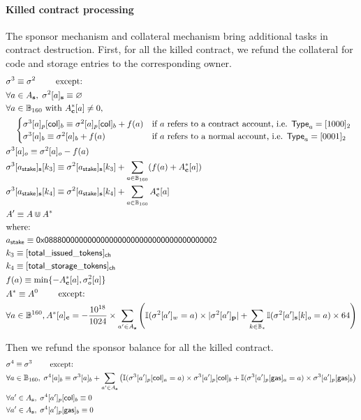 \paragraph{Killed contract processing} The sponsor mechanism and collateral mechanism bring additional tasks in contract destruction. First, for all the killed contract, we refund the collateral for code and storage entries to the corresponding owner. 
\begin{align}
	& \st^3  \eqdef \st^2 \qquad \mbox{  except:}\\
	& \forall a \in A_{\bf s},\; \st^2[a]_{\bf s} \eqdef \varnothing \\
	&\forall a \in \B_{160} \text{ with }  A^*_{\bf c}[a]\neq 0, \\
	&\quad \begin{cases}
	\st^3[a]_p[{\sf col}]_b \eqdef \st^2[a]_p[{\sf col}]_b + f(a) & \mbox{if $a$ refers to a contract account, i.e. $\mathsf{Type}_{a}=\typecontract$} \\
	\st^3[a]_b \eqdef \st^2[a]_b + f(a) & \mbox{if $a$ refers to a normal account, i.e. $\mathsf{Type}_{a}= \typenormal$}
	\end{cases}\\
	& \st^3[a]_o \eqdef \st^2[a]_o - f(a)\\ 
	&\st^3[a_{\sf stake}]_{\bf s}[k_3] \eqdef \st^2[a_{\sf stake}]_{\bf s}[k_3] + \sum_{a\in \B_{160}}(f(a) + A^*_{\bf c}[a]) \\
	&\st^3[a_{\sf stake}]_{\bf s}[k_4] \eqdef \st^2[a_{\sf stake}]_{\bf s}[k_4] + \sum_{a\in \B_{160}}A^*_{\bf c}[a] \\
	& A' \eqdef A \Cup A^* \\ 
	&\mbox{where:}  \\
	&a_{\sf stake} \eqdef \stakingcontract \\ 
	&k_3 \eqdef {\sf [total\char`_issued\char`_tokens]_{\sf ch}}  \\ 
	&k_4 \eqdef {\sf [total\char`_storage\char`_tokens]_{\sf ch}}  \\ 
	& f(a) \eqdef \min\{-A^*_{\bf c}[a], \st^2_o[a]\} \\
	& A^* \eqdef A^0 \qquad \mbox{  except:}\\
	& \forall a \in \B^{160}, A^*[a]_{\bf c} = - \collateralperbyte \times \sum_{a'\in A_{\bf s}}\left(\mathbb{I}(\st^2[a']_{w}=a) \times |\st^2[a']_{\bf p}| + \sum_{k\in \B_*} \mathbb{I}(\st^2[a']_{\bf s}[k]_o=a)\times 64\right) 
\end{align}

Then we refund the sponsor balance for all the killed contract. 
%
\begin{align}
	&\mathbf{\sigma}^4  \equiv \mathbf{\sigma}^3 \qquad \mbox{  except:}\\
	&\forall a \in \mathbb{B}_{160},\;  \mathbf{\sigma}^4[a]_b\equiv \mathbf{\sigma}^3[a]_b + \sum_{a'\in A_{\bf s}} \left(\mathbb{I}(\mathbf{\sigma}^3[a']_p[{\sf col}]_a=a)\times \mathbf{\sigma}^3[a']_p[{\sf col}]_b + \mathbb{I}(\mathbf{\sigma}^3[a']_p[{\sf gas}]_a=a)\times \mathbf{\sigma}^3[a']_p[{\sf gas}]_b \right)\\
	&\forall a' \in A_{\bf s},\; \mathbf{\sigma}^4[a']_p[{\sf col}]_b\equiv 0 \\
	&\forall a' \in A_{\bf s},\; \mathbf{\sigma}^4[a']_p[{\sf gas}]_b\equiv 0
\end{align}

